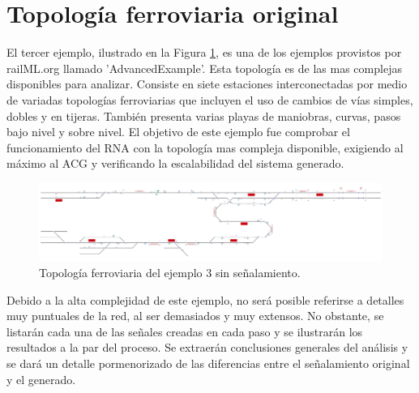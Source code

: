 \section{Topología ferroviaria original}

	El tercer ejemplo, ilustrado en la Figura \ref{fig:EJ3_1}, es una de los ejemplos provistos por railML.org llamado 'AdvancedExample'. Esta topología es de las mas complejas disponibles para analizar. Consiste en siete estaciones interconectadas por medio de variadas topologías ferroviarias que incluyen el uso de cambios de vías simples, dobles y en tijeras. También presenta varias playas de maniobras, curvas, pasos bajo nivel y sobre nivel. El objetivo de este ejemplo fue comprobar el funcionamiento del RNA con la topología mas compleja disponible, exigiendo al máximo al ACG y verificando la escalabilidad del sistema generado.
	
	\begin{figure}[h]
		\centering
		\includegraphics[width=1\textwidth]{resultados-obtenidos/ejemplo3/images/3_empty.png}
		\centering\caption{Topología ferroviaria del ejemplo 3 sin señalamiento.}
		\label{fig:EJ3_1}
	\end{figure}
	
	Debido a la alta complejidad de este ejemplo, no será posible referirse a detalles muy puntuales de la red, al ser demasiados y muy extensos. No obstante, se listarán cada una de las señales creadas en cada paso y se ilustrarán los resultados a la par del proceso. Se extraerán conclusiones generales del análisis y se dará un detalle pormenorizado de las diferencias entre el señalamiento original y el generado.
